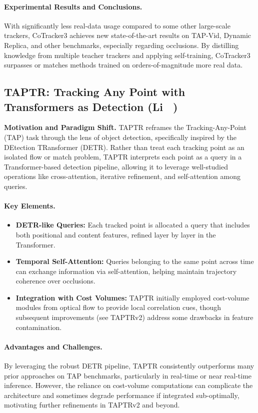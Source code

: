 \documentclass[11pt]{article}
\begin{document}
\paragraph{Experimental Results and Conclusions.}
With significantly less real-data usage compared to some other large-scale trackers, CoTracker3 achieves new state-of-the-art results on TAP-Vid, Dynamic Replica, and other benchmarks, especially regarding occlusions. By distilling knowledge from multiple teacher trackers and applying self-training, CoTracker3 surpasses or matches methods trained on orders-of-magnitude more real data.

\subsection{TAPTR: Tracking Any Point with Transformers as Detection (Li \etal~\cite{li2024taptr})}
\textbf{Motivation and Paradigm Shift.}
TAPTR reframes the Tracking-Any-Point (TAP) task through the lens of object detection, specifically inspired by the DEtection TRansformer (DETR). Rather than treat each tracking point as an isolated flow or match problem, TAPTR interprets each point as a query in a Transformer-based detection pipeline, allowing it to leverage well-studied operations like cross-attention, iterative refinement, and self-attention among queries.

\paragraph{Key Elements.}
\begin{itemize}
\item \textbf{DETR-like Queries:} Each tracked point is allocated a query that includes both positional and content features, refined layer by layer in the Transformer. 
\item \textbf{Temporal Self-Attention:} Queries belonging to the same point across time can exchange information via self-attention, helping maintain trajectory coherence over occlusions.
\item \textbf{Integration with Cost Volumes:} TAPTR initially employed cost-volume modules from optical flow to provide local correlation cues, though subsequent improvements (see TAPTRv2) address some drawbacks in feature contamination.
\end{itemize}

\paragraph{Advantages and Challenges.}
By leveraging the robust DETR pipeline, TAPTR consistently outperforms many prior approaches on TAP benchmarks, particularly in real-time or near real-time inference. However, the reliance on cost-volume computations can complicate the architecture and sometimes degrade performance if integrated sub-optimally, motivating further refinements in TAPTRv2 and beyond.
\end{document}
